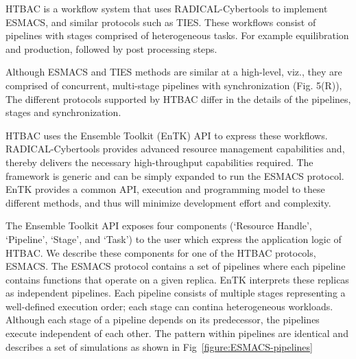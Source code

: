 


HTBAC is a workflow system that uses RADICAL-Cybertools to implement ESMACS,
and similar protocols such as TIES. These workflows consist of pipelines with
stages comprised of heterogeneous tasks. For example equilibration and
production, followed by post processing steps. 

Although ESMACS and TIES methods are similar at a high-level, viz., they are
comprised of concurrent, multi-stage pipelines with synchronization (Fig.
5(R)), The different protocols supported by HTBAC differ in the details of the
pipelines, stages and synchronization.

HTBAC uses the Ensemble Toolkit (EnTK) API to express these workflows. RADICAL-Cybertools
provides advanced resource management capabilities and, thereby delivers the
necessary high-throughput capabilities required. The framework is generic and
can be simply expanded to run the ESMACS protocol. EnTK provides a common API,
execution and programming model to these different methods, and thus will
minimize development effort and complexity.

The Ensemble Toolkit API exposes four components (‘Resource
Handle’, ‘Pipeline’, ‘Stage’, and ‘Task') to the user which express the
application logic of HTBAC. We describe these components for one of the HTBAC
protocols, ESMACS. The ESMACS protocol contains a set of pipelines where each
pipeline contains functions that operate on a given replica. EnTK interprets these replicas as independent pipelines. Each pipeline consists of multiple stages representing a well-defined execution order; each stage can contina heterogeneous workloads. Although each stage of a pipeline depends on its predecessor, the pipelines execute independent of each other. The pattern within pipelines are identical and describes a set of simulations as shown in Fig~\ref{figure:ESMACS-pipelines}

